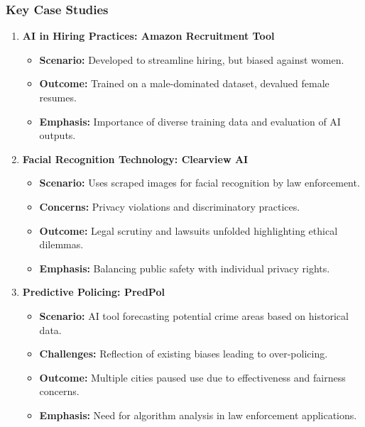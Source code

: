 \documentclass[aspectratio=169]{beamer}
\begin{document}
\begin{frame}[fragile]
    \frametitle{Key Case Studies}
    \begin{enumerate}
        \item \textbf{AI in Hiring Practices: Amazon Recruitment Tool}
        \begin{itemize}
            \item \textbf{Scenario:} Developed to streamline hiring, but biased against women.
            \item \textbf{Outcome:} Trained on a male-dominated dataset, devalued female resumes.
            \item \textbf{Emphasis:} Importance of diverse training data and evaluation of AI outputs.
        \end{itemize}
        
        \item \textbf{Facial Recognition Technology: Clearview AI}
        \begin{itemize}
            \item \textbf{Scenario:} Uses scraped images for facial recognition by law enforcement.
            \item \textbf{Concerns:} Privacy violations and discriminatory practices.
            \item \textbf{Outcome:} Legal scrutiny and lawsuits unfolded highlighting ethical dilemmas.
            \item \textbf{Emphasis:} Balancing public safety with individual privacy rights.
        \end{itemize}

        \item \textbf{Predictive Policing: PredPol}
        \begin{itemize}
            \item \textbf{Scenario:} AI tool forecasting potential crime areas based on historical data.
            \item \textbf{Challenges:} Reflection of existing biases leading to over-policing.
            \item \textbf{Outcome:} Multiple cities paused use due to effectiveness and fairness concerns.
            \item \textbf{Emphasis:} Need for algorithm analysis in law enforcement applications.
        \end{itemize}
    \end{enumerate}
\end{frame}
\end{document}
